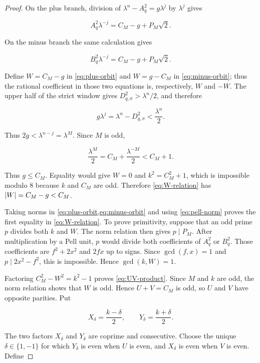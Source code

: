 \begin{proof}
On the plus branch, division of
$\lambda^n-A_q^2=g\lambda^j$ by $\lambda^j$ gives

\begin{equation}
 A_q^2\lambda^{-j}=C_M-g+P_M\sqrt2.
 \label{eq:plus-orbit}
\end{equation}

On the minus branch the same calculation gives

\begin{equation}
 B_q^2\lambda^{-j}=C_M-g+P_M\sqrt2.
 \label{eq:minus-orbit}
\end{equation}

Define $W=C_M-g$ in \cref{eq:plus-orbit} and $W=g-C_M$ in
\cref{eq:minus-orbit}; thus the rational coefficient in those two equations
is, respectively, $W$ and $-W$. The upper half of the strict window gives
$D_{q,\sigma}^2>\lambda^n/2$, and therefore

$$
 g\lambda^j=\lambda^n-D_{q,\sigma}^2<\frac{\lambda^n}{2}.
$$

Thus $2g<\lambda^{n-j}=\lambda^M$. Since $M$ is odd,

\begin{equation}
 \frac{\lambda^M}{2}=C_M+\frac{\lambda^{-M}}2<C_M+1.
\end{equation}

Thus $g\leqslant C_M$. Equality would give $W=0$ and
$k^2=C_M^2+1$, which is impossible modulo $8$ because $k$ and $C_M$ are
odd. Therefore \cref{eq:W-relation} has $\lvert W\rvert=C_M-g<C_M$.

Taking norms in \cref{eq:plus-orbit,eq:minus-orbit} and using
\cref{eq:pell-norm} proves the first equality in \cref{eq:W-relation}. To
prove primitivity, suppose that an odd prime $p$ divides both $k$ and $W$.
The norm relation then gives $p\mid P_M$. After multiplication by a Pell
unit, $p$ would divide both coefficients of $A_q^2$ or $B_q^2$. Those
coefficients are $f^2+2x^2$ and $2fx$ up to signs. Since
$\gcd(f,x)=1$ and $p\mid2x^2-f^2$, this is impossible. Hence
$\gcd(k,W)=1$.

Factoring $C_M^2-W^2=k^2-1$ proves
\cref{eq:UV-product}. Since $M$ and $k$ are odd, the norm relation shows
that $W$ is odd. Hence $U+V=C_M$ is odd, so $U$ and $V$ have opposite
parities. Put

\begin{equation}
 X_\delta=\frac{k-\delta}{2},
 \qquad
 Y_\delta=\frac{k+\delta}{2}.
\end{equation}

The two factors $X_\delta$ and $Y_\delta$ are coprime and consecutive.
Choose the unique $\delta\in\{1,-1\}$ for which $Y_\delta$ is even when
$U$ is even, and $X_\delta$ is even when $V$ is even. Define


\end{proof}
